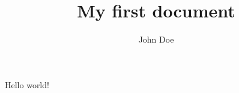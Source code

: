 \documentclass{article}
\title{My first document}
\author{John Doe}
\begin{document}
   \maketitle
   Hello world!
\end{document}
